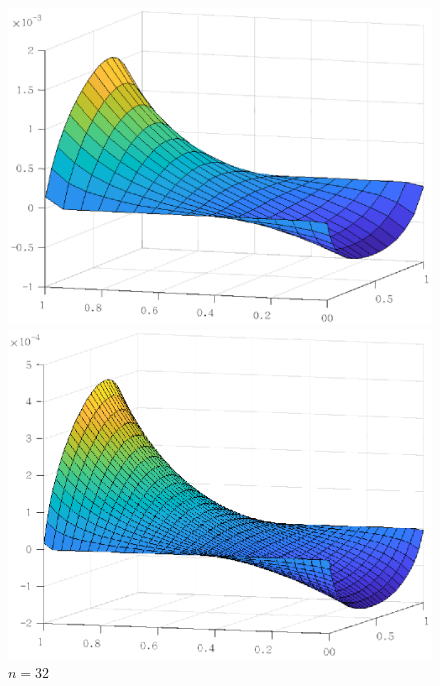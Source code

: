 \documentclass[lang=cn,10pt]{elegantbook}
\begin{document}
\begin{figure}[H]
  \centering
  \begin{minipage}[t]{0.24\linewidth}
      \centering
      \includegraphics[width=0.95\linewidth]{figure/3-3-1.eps}
      \caption*{$n=16$}
  \end{minipage}
  \begin{minipage}[t]{0.24\linewidth}
    \centering
    \includegraphics[width=0.95\linewidth]{figure/3-3-2.eps}
    \caption*{$n=32$}
  \end{minipage}
  \begin{minipage}[t]{0.24\linewidth}
    \centering

\end{minipage}
\end{figure}
\end{document}
